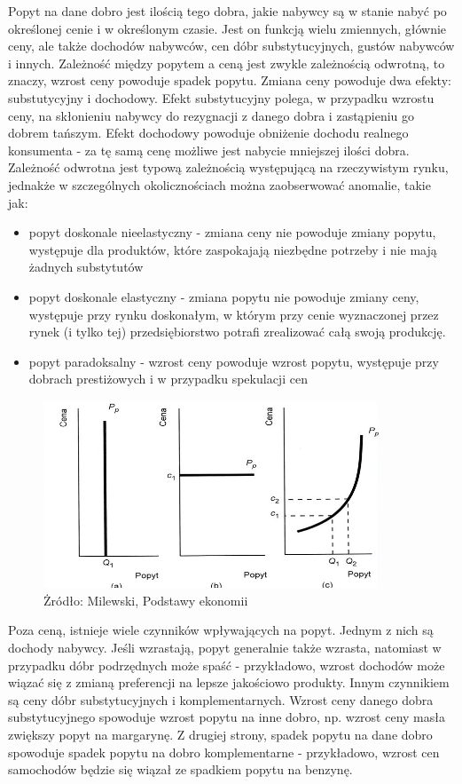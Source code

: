 \documentclass[12pt]{extarticle}
\begin{document}
Popyt na dane dobro jest ilością tego dobra, jakie nabywcy są w stanie nabyć po określonej cenie i w określonym czasie. Jest on funkcją wielu zmiennych, głównie ceny, ale także dochodów nabywców, cen dóbr substytucyjnych, gustów nabywców i innych. Zależność między popytem a ceną jest zwykle zależnością odwrotną, to znaczy, wzrost ceny powoduje spadek popytu. Zmiana ceny powoduje dwa efekty: substutycyjny i dochodowy. Efekt substytucyjny polega, w przypadku wzrostu ceny, na skłonieniu nabywcy do rezygnacji z danego dobra i zastąpieniu go dobrem tańszym. Efekt dochodowy powoduje obniżenie dochodu realnego konsumenta - za tę samą cenę możliwe jest nabycie mniejszej ilości dobra. Zależność odwrotna jest typową zależnością występującą na rzeczywistym rynku, jednakże w szczególnych okolicznościach można zaobserwować anomalie, takie jak:

\begin{itemize}
	\item popyt doskonale nieelastyczny - zmiana ceny nie powoduje zmiany popytu, występuje dla produktów, które zaspokajają niezbędne potrzeby i nie mają żadnych substytutów
    \item popyt doskonale elastyczny - zmiana popytu nie powoduje zmiany ceny, występuje przy rynku doskonałym, w którym przy cenie wyznaczonej przez rynek (i tylko tej) przedsiębiorstwo potrafi zrealizować całą swoją produkcję.
    \item popyt paradoksalny - wzrost ceny powoduje wzrost popytu, występuje przy dobrach prestiżowych i w przypadku spekulacji cen
\end{itemize}

\begin{figure}[H]
\centering
\includegraphics[width=10cm]{popyt_nietypowy}
    \caption{Żródło: Milewski, Podstawy ekonomii}
\end{figure}


Poza ceną, istnieje wiele czynników wpływających na popyt. Jednym z nich są dochody nabywcy. Jeśli wzrastają, popyt generalnie także wzrasta, natomiast w przypadku dóbr podrzędnych może spaść - przykładowo, wzrost dochodów może wiązać się z zmianą preferencji na lepsze jakościowo produkty. Innym czynnikiem są ceny dóbr substytucyjnych i komplementarnych. Wzrost ceny danego dobra substytucyjnego spowoduje wzrost popytu na inne dobro, np. wzrost ceny masła zwiększy popyt na margarynę. Z drugiej strony, spadek popytu na dane dobro spowoduje spadek popytu na dobro komplementarne - przykładowo, wzrost cen samochodów będzie się wiązał ze spadkiem popytu na benzynę.
\end{document}
